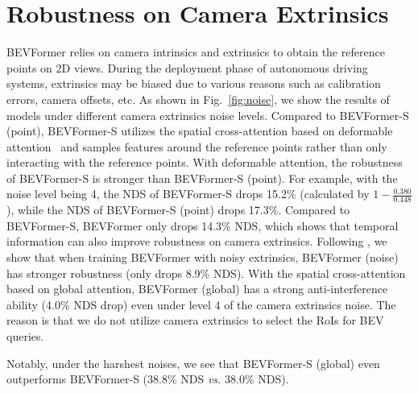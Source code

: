 \documentclass{article}
\begin{document}
\section{Robustness on Camera Extrinsics}
BEVFormer relies on camera intrinsics and extrinsics to obtain the reference points on 2D views. During the deployment phase of autonomous driving systems, extrinsics may be biased due to various reasons such as calibration errors, camera offsets, etc. As shown in Fig.~\ref{fig:noise}, we show the results of models under different camera extrinsics noise levels.
Compared to BEVFormer-S (point), BEVFormer-S utilizes the spatial cross-attention based on deformable attention~\cite{zhu2020deformable} and samples features around the reference points rather than only interacting with the reference points. 
With deformable attention, the robustness of 
BEVFormer-S  is stronger than BEVFormer-S (point). For example, with the noise level being 4, the NDS of BEVFormer-S drops 15.2\% (calculated by $1-\frac{0.380}{0.448}$), while the NDS of BEVFormer-S (point) drops 17.3\%. Compared to BEVFormer-S, BEVFormer only drops 14.3\% NDS, which shows that temporal information can also improve robustness on camera extrinsics.
Following \cite{philion2020lift}, we show that when training BEVFormer with noisy extrinsics, BEVFormer (noise) has stronger robustness (only drops 8.9\% NDS). With the spatial cross-attention based on global attention, BEVFormer (global) has a strong anti-interference ability (4.0\% NDS drop) even under level 4 of the camera extrinsics noise. The reason is that we do not utilize camera extrinsics to select the RoIs for BEV queries.

Notably, under the harshest noises, we see that BEVFormer-S (global) even outperforms BEVFormer-S (38.8\% NDS \emph{vs.} 38.0\% NDS). 
\end{document}
